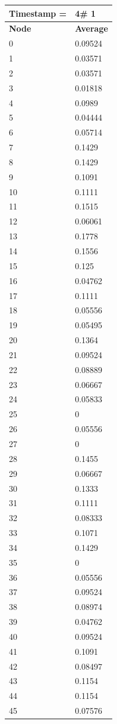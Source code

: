 \begin{tabular}{|l||l|}
\hline
\textbf{Timestamp =} & \textbf{4}\# 1\\\hline
	\textbf{Node} & \textbf{Average} \\ \hline
\hline
	0 & 0.09524 \\ \hline
	1 & 0.03571 \\ \hline
	2 & 0.03571 \\ \hline
	3 & 0.01818 \\ \hline
	4 & 0.0989 \\ \hline
	5 & 0.04444 \\ \hline
	6 & 0.05714 \\ \hline
	7 & 0.1429 \\ \hline
	8 & 0.1429 \\ \hline
	9 & 0.1091 \\ \hline
	10 & 0.1111 \\ \hline
	11 & 0.1515 \\ \hline
	12 & 0.06061 \\ \hline
	13 & 0.1778 \\ \hline
	14 & 0.1556 \\ \hline
	15 & 0.125 \\ \hline
	16 & 0.04762 \\ \hline
	17 & 0.1111 \\ \hline
	18 & 0.05556 \\ \hline
	19 & 0.05495 \\ \hline
	20 & 0.1364 \\ \hline
	21 & 0.09524 \\ \hline
	22 & 0.08889 \\ \hline
	23 & 0.06667 \\ \hline
	24 & 0.05833 \\ \hline
	25 & 0 \\ \hline
	26 & 0.05556 \\ \hline
	27 & 0 \\ \hline
	28 & 0.1455 \\ \hline
	29 & 0.06667 \\ \hline
	30 & 0.1333 \\ \hline
	31 & 0.1111 \\ \hline
	32 & 0.08333 \\ \hline
	33 & 0.1071 \\ \hline
	34 & 0.1429 \\ \hline
	35 & 0 \\ \hline
	36 & 0.05556 \\ \hline
	37 & 0.09524 \\ \hline
	38 & 0.08974 \\ \hline
	39 & 0.04762 \\ \hline
	40 & 0.09524 \\ \hline
	41 & 0.1091 \\ \hline
	42 & 0.08497 \\ \hline
	43 & 0.1154 \\ \hline
	44 & 0.1154 \\ \hline
	45 & 0.07576 \\ \hline
\end{tabular}
